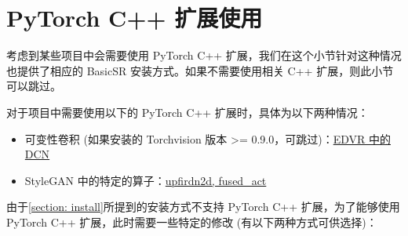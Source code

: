 \documentclass[../main.tex]{subfiles}
\begin{document}

\section{PyTorch C++ 扩展使用}
\label{section:c++}

\begin{note} %

	考虑到某些项目中会需要使用 PyTorch C++ 扩展，我们在这个小节针对这种情况也提供了相应的 BasicSR 安装方式。如果不需要使用相关 C++ 扩展，则此小节可以跳过。
\end{note}

对于项目中需要使用以下的 PyTorch C++ 扩展时，具体为以下两种情况：

\begin{itemize}
    \item 可变性卷积 (如果安装的 Torchvision 版本 >= 0.9.0，可跳过)：\href{https://github.com/XPixelGroup/BasicSR/tree/master/basicsr/ops}{EDVR 中的 DCN}

    \item StyleGAN 中的特定的算子：\href{https://github.com/XPixelGroup/BasicSR/tree/master/basicsr/ops}{upfirdn2d, fused\_act}
\end{itemize}

由于\ref{section: install}所提到的安装方式不支持 PyTorch C++ 扩展，为了能够使用 PyTorch C++ 扩展，此时需要一些特定的修改 (有以下两种方式可供选择)：
\end{document}

